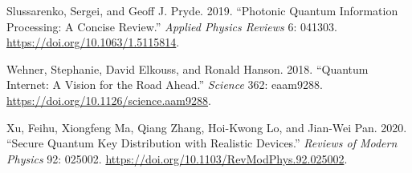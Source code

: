 \documentclass[
  11pt,
  letterpaper,
]{article}
\newlength{\cslhangindent}
\newenvironment{CSLReferences}[2] %
 {\begin{list}{}{%
  \setlength{\itemindent}{0pt}
  \setlength{\leftmargin}{0pt}
  \setlength{\parsep}{0pt}
  \ifodd #1
   \setlength{\leftmargin}{\cslhangindent}
   \setlength{\itemindent}{-1\cslhangindent}
  \fi
  \setlength{\itemsep}{#2\baselineskip}}}
 {\end{list}}
\begin{document}
\begin{CSLReferences}{1}{0}
Slussarenko, Sergei, and Geoff J. Pryde. 2019. {``Photonic Quantum
Information Processing: A Concise Review.''} \emph{Applied Physics
Reviews} 6: 041303. \url{https://doi.org/10.1063/1.5115814}.

Wehner, Stephanie, David Elkouss, and Ronald Hanson. 2018. {``Quantum
Internet: A Vision for the Road Ahead.''} \emph{Science} 362: eaam9288.
\url{https://doi.org/10.1126/science.aam9288}.

Xu, Feihu, Xiongfeng Ma, Qiang Zhang, Hoi-Kwong Lo, and Jian-Wei Pan.
2020. {``Secure Quantum Key Distribution with Realistic Devices.''}
\emph{Reviews of Modern Physics} 92: 025002.
\url{https://doi.org/10.1103/RevModPhys.92.025002}.

\end{CSLReferences}
\end{document}

